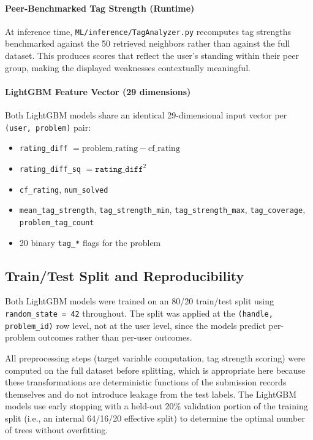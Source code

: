 \documentclass[12pt,a4paper]{article}
\begin{document}
\paragraph{Peer-Benchmarked Tag Strength (Runtime)}
At inference time, \newline
\texttt{ML/inference/TagAnalyzer.py} recomputes tag strengths
benchmarked against the 50 retrieved neighbors rather than against the full
dataset. This produces scores that reflect the user's standing within their peer
group, making the displayed weaknesses contextually meaningful.

\paragraph{LightGBM Feature Vector (29 dimensions)}
Both LightGBM models share an identical 29-dimensional input vector per
\texttt{(user, problem)} pair:
\begin{itemize}
    \item \texttt{rating\_diff} $= \text{problem\_rating} - \text{cf\_rating}$
    \item \texttt{rating\_diff\_sq} $= \texttt{rating\_diff}^2$
    \item \texttt{cf\_rating}, \texttt{num\_solved}
    \item \texttt{mean\_tag\_strength}, \texttt{tag\_strength\_min},
          \texttt{tag\_strength\_max}, \texttt{tag\_coverage}, \newline \texttt{problem\_tag\_count}
    \item 20 binary \texttt{tag\_*} flags for the problem
\end{itemize}

\subsection*{Train/Test Split and Reproducibility}

Both LightGBM models were trained on an 80/20 train/test split using
\texttt{random\_state = 42} throughout. The split was applied at the
\texttt{(handle, problem\_id)} row level, not at the user level, since the
models predict per-problem outcomes rather than per-user outcomes.

All preprocessing steps (target variable computation, tag strength scoring) were
computed on the full dataset before splitting, which is appropriate here because
these transformations are deterministic functions of the submission records
themselves and do not introduce leakage from the test labels. The LightGBM
models use early stopping with a held-out 20\% validation portion of the
training split (i.e., an internal 64/16/20 effective split) to determine the
optimal number of trees without overfitting.
\end{document}
